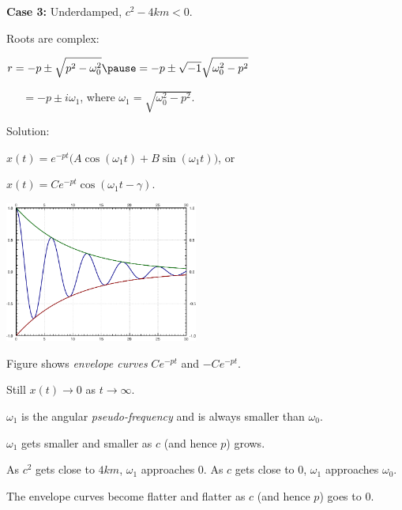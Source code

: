 \documentclass[10pt,aspectratio=169]{beamer}
\begin{document}
\begin{frame}
\textbf{Case 3:}
Underdamped, \quad
$c^2 - 4km < 0$.

\medskip
\pause

Roots are complex:



\quad
$
\displaystyle
r  =
-p \pm \sqrt{p^2 - \omega_0^2}
\pause
 = 
-p \pm \sqrt{-1}\sqrt{\omega_0^2 - p^2}
$

\medskip
\pause

$\quad\phantom{r}
 = 
-p \pm i \omega_1$,
\quad
where $\omega_1 =\sqrt{\omega_0^2 - p^2}$.

\medskip
\pause

Solution:

\medskip

\quad$\displaystyle
x(t) = e^{-pt} \bigl( A \cos (\omega_1 t) + B \sin (\omega_1 t) \bigr)$,
\quad or

\medskip

\quad$\displaystyle
x(t) = C e^{-pt} \cos ( \omega_1 t - \gamma )$.

\vspace*{-1.8in}

\hfill\includegraphics[width=2.5in]{../figures/mv-underdamped}

\vspace*{-0.0in}

\pause
Figure shows
\emph{envelope curves}
$C e^{-pt}$ and $-C e^{-pt}$.

\pause
Still $x(t) \to 0$ as $t \to \infty$.

\medskip
\pause

$\omega_1$ is the angular \emph{pseudo-frequency}
and is always smaller than $\omega_0$.

\medskip
\pause

$\omega_1$ gets smaller and smaller as $c$ (and hence $p$) grows.

\medskip
\pause

As $c^2$ gets close to $4km$, $\omega_1$ approaches 0.
\quad
\pause
As $c$ gets close to 0, $\omega_1$ approaches $\omega_0$.

\medskip
\pause

The envelope curves become flatter and flatter as $c$ (and hence $p$) goes to $0$.
\end{frame}
\end{document}
